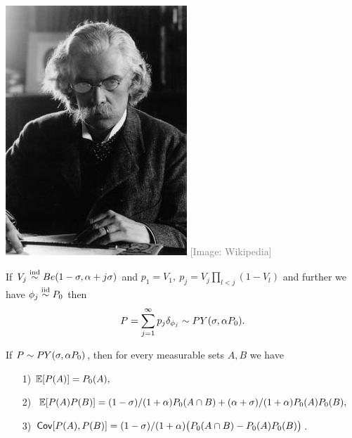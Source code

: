 \includegraphics[width=\textwidth]{figures_julyan/trombi/Mittag-Leffler}
		\hfill\textcolor{gray}{[Image: Wikipedia]}





\begin{theorem}
If $V_j\stackrel{\mbox{\scriptsize{ind}}}{\sim} Be(1-\sigma, \alpha + j\sigma)$ and $p_1=V_1,\ p_j=V_j\prod_{l<j}(1-V_l)$ and further we have $\phi_j\stackrel{\mbox{\scriptsize{iid}}}{\sim} P_0$ then 
$$
P=\sum_{j=1}^\infty p_j \delta_{\phi_j} \sim PY(\sigma,\alpha P_0).
$$
\end{theorem}



\begin{proposition}
[Moments of PY] If $P\sim PY(\sigma, \alpha P_0)$, then for every measurable sets $A,B$ we have
\begin{enumerate}
    \item[1)] $\mathbb{E} [P(A)] = P_0(A),$
    \item[2)] $\mathbb{E}[P(A)P(B)]=(1-\sigma)/(1+\alpha)P_0(A\cap B) + (\alpha + \sigma)/(1+ \alpha)P_0(A)P_0(B),$
    \item[3)] $\mathsf{Cov}[P(A),P(B)] = (1-\sigma)/(1+\alpha)\big(P_0(A\cap B) -P_0(A)P_0(B)\big)$.  
\end{enumerate}
\end{proposition}


